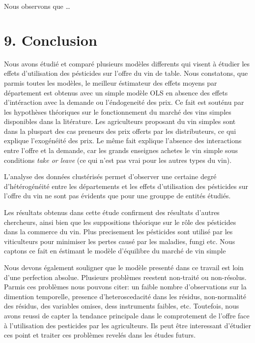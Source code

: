 \documentclass[11pt,]{article}
\begin{document}
\FloatBarrier

Nous observons que \ldots{}

\hypertarget{conclusion}{%
\section{9. Conclusion}\label{conclusion}}

Nous avons étudié et comparé plusieurs modèles differents qui visent à
étudier les effets d'utilisation des pésticides sur l'offre du vin de
table. Nous constatons, que parmis toutes les modèles, le meilleur
éstimateur des effets moyens par département est obtenus avec un simple
modèle OLS en absence des effets d'intéraction avec la demande ou
l'éndogeneité des prix. Ce fait est souténu par les hypothèses
théoriques sur le fonctionnement du marché des vins simples disponibles
dans la litérature. Les agriculteurs proposant du vin simples sont dans
la pluspart des cas preneurs des prix offerts par les distributeurs, ce
qui explique l'exogénéité des prix. Le même fait explique l'absence des
interactions entre l'offre et la demande, car les grands enseignes
achetes le vin simple sous conditions \emph{take or leave} (ce qui n'est
pas vrai pour les autres types du vin).

L'analyse des données clustérisés permet d'observer une certaine degré
d'hétérogénéité entre les départements et les effets d'utilisation des
pésticides sur l'offre du vin ne sont pas évidents que pour une grouppe
de entités étudiés.

Les résultats obtenus dans cette étude confirment des résultats d'autres
chercheurs, ainsi bien que les suppositions théorique sur le rôle des
pésticides dans la commerce du vin. Plus precisement les pésticides sont
utilisé par les viticulteurs pour minimiser les pertes causé par les
maladies, fungi etc. Nous captons ce fait en éstimant le modèle
d'équilibre du marché de vin simple

Nous devons également souligner que le modèle presenté dans ce travail
est loin d'une perfection absolue. Plusieurs problèmes reestent
non-traité ou non-résolus. Parmis ces problèmes nous pouvons citer: un
faible nombre d'observations sur la dimention temporelle, presence
d'heteroscedacité dans les résidus, non-normalité des résidus, des
variables omises, dess instruments faibles, etc. Toutefois, nous avons
reussi de capter la tendance principale dans le comprotement de l'offre
face à l'utilisation des pesticides par les agriculteurs. Ils peut être
interessant d'étudier ces point et traiter ces problèmes revelés dans
les études futurs.
\end{document}
